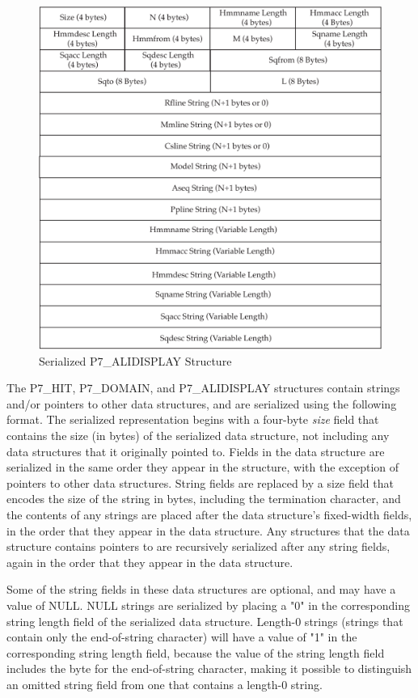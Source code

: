 \documentclass[notoc,justified]{tufte-book}    %
\begin{document}
\begin{figure}
\includegraphics[width=\textwidth]{inclusions/alidisplay-serialize.pdf}
\caption{Serialized {P7\_ALIDISPLAY} Structure}
\label{fig:alidisplay-serialize}
\end{figure}

The {P7\_HIT}, {P7\_DOMAIN}, and {P7\_ALIDISPLAY} structures contain strings and/or pointers to other data structures, and are serialized using the following format.  The serialized representation begins with a four-byte {\em size} field that contains the size (in bytes) of the serialized data structure, not including any data structures that it originally pointed to\sidenote{}.  Fields in the data structure are serialized in the same order they appear in the structure, with the exception of pointers to other data structures.  String fields are replaced by a size field that encodes the size of the string in bytes, including the termination character, and the contents of any strings are placed after the data structure's fixed-width fields, in the order that they appear in the data structure.  Any structures that the data structure contains pointers to are recursively serialized after any string fields, again in the order that they appear in the data structure.

Some of the string fields in these data structures are optional, and may have a value of NULL.  NULL strings are serialized by placing a "0" in the corresponding string length field of the serialized data structure.  Length-0 strings (strings that contain only the end-of-string character) will have a value of "1" in the corresponding string length field, because the value of the string length field includes the byte for the end-of-string character, making it possible to distinguish an omitted string field from one that contains a length-0 string.
\end{document}
